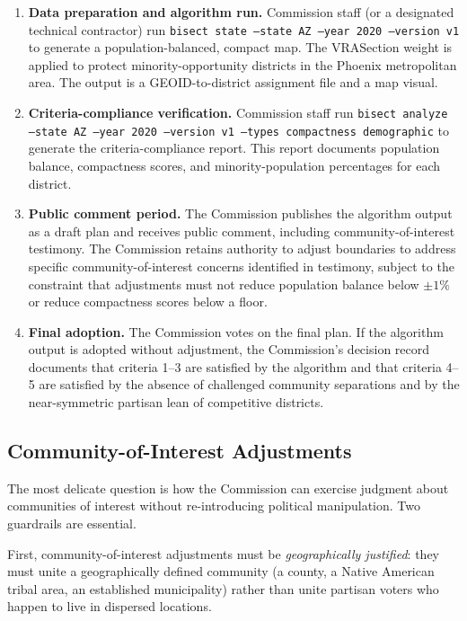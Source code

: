 \begin{enumerate}
  \item \textbf{Data preparation and algorithm run.}  Commission staff
    (or a designated technical contractor) run \texttt{bisect state --state AZ
    --year 2020 --version v1} to generate a population-balanced, compact map.
    The VRASection weight is applied to protect minority-opportunity districts
    in the Phoenix metropolitan area.  The output is a GEOID-to-district
    assignment file and a map visual.

  \item \textbf{Criteria-compliance verification.}  Commission staff run
    \texttt{bisect analyze --state AZ --year 2020 --version v1 --types
    compactness demographic} to generate the criteria-compliance report.
    This report documents population balance, compactness scores, and
    minority-population percentages for each district.

  \item \textbf{Public comment period.}  The Commission publishes the
    algorithm output as a draft plan and receives public comment, including
    community-of-interest testimony.  The Commission retains authority to
    adjust boundaries to address specific community-of-interest concerns
    identified in testimony, subject to the constraint that adjustments must
    not reduce population balance below $\pm 1\%$ or reduce compactness
    scores below a floor.

  \item \textbf{Final adoption.}  The Commission votes on the final plan.
    If the algorithm output is adopted without adjustment, the Commission's
    decision record documents that criteria 1--3 are satisfied by the
    algorithm and that criteria 4--5 are satisfied by the absence of
    challenged community separations and by the near-symmetric partisan
    lean of competitive districts.
\end{enumerate}

\subsection{Community-of-Interest Adjustments}

The most delicate question is how the Commission can exercise judgment about
communities of interest without re-introducing political manipulation.  Two
guardrails are essential.

First, community-of-interest adjustments must be \emph{geographically
justified}: they must unite a geographically defined community (a county,
a Native American tribal area, an established municipality) rather than
unite partisan voters who happen to live in dispersed locations.

